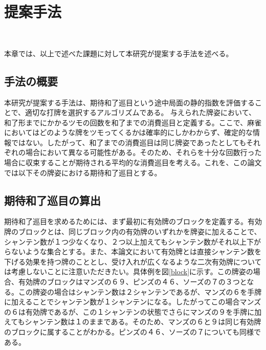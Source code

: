 \chapter{提案手法}　%
\label{chap:approach}

本章では、以上で述べた課題に対して本研究が提案する手法を述べる。

\section{手法の概要}
本研究が提案する手法は、期待和了巡目という途中局面の静的指数を評価することで、適切な打牌を選択するアルゴリズムである。
与えられた牌姿において、和了形までにかかるツモの回数を和了までの消費巡目と定義する。ここで、麻雀においてはどのような牌をツモってくるかは確率的にしかわからず、確定的な情報ではない。したがって、和了までの消費巡目は同じ牌姿であったとしてもそれぞれの場合において異なる可能性がある。そのため、それらを十分な回数行った場合に収束することが期待される平均的な消費巡目を考える。これを、この論文では以下その牌姿における期待和了巡目とする。


\section{期待和了巡目の算出}


期待和了巡目を求めるためには、まず最初に有効牌のブロックを定義する。有効牌のブロックとは、同じブロック内の有効牌のいずれかを牌姿に加えることで、シャンテン数が１つ少なくなり、２つ以上加えてもシャンテン数がそれ以上下がらないような集合とする。また、本論文において有効牌とは直接シャンテン数を下げる効果を持つ牌のこととし、受け入れが広くなるような二次有効牌については考慮しないことに注意いただきたい。具体例を図\ref{block}に示す。この牌姿の場合、有効牌のブロックはマンズの６９、ピンズの４６、ソーズの７の３つとなる。この牌姿の場合はシャンテン数は２シャンテンであるが、マンズの６を手牌に加えることでシャンテン数が１シャンテンになる。したがってこの場合マンズの６は有効牌であるが、この１シャンテンの状態でさらにマンズの９を手牌に加えてもシャンテン数は１のままである。そのため、マンズの６と９は同じ有効牌のブロックに属することがわかる。ピンズの４６、ソーズの７についても同様である。

